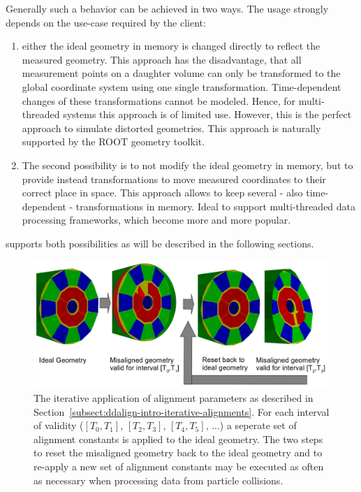 \documentclass[10pt,a4paper]{article}
\begin{document}
\noindent
Generally such a behavior can be achieved in two ways. The usage strongly depends
on the use-case required by the client:
\begin{enumerate}
\item either the ideal geometry in memory is changed directly to 
      reflect the  measured geometry. This approach has the 
      disadvantage, that all measurement points on a daughter 
      volume can only be transformed to the global coordinate
      system using one single transformation. Time-dependent changes of 
      these transformations cannot be modeled. Hence, for multi-threaded
      systems this approach is of limited use. However, this is the 
      perfect approach to simulate distorted geometries. This approach 
      is naturally supported by the ROOT geometry toolkit.
\item The second possibility is to not modify the ideal geometry in memory,
      but to provide instead transformations to move measured coordinates 
      to their correct place in space. This approach allows to keep 
      several - also time-dependent - transformations in memory. 
      Ideal to support multi-threaded data processing frameworks, 
      which become more and more popular.
\end{enumerate}

\noindent
\DDA supports both possibilities as will be described in the following sections.

\begin{figure}[t]
  \begin{center}
    \includegraphics[width=160mm] {DDAlign-iterative-misalignment}
    \caption{The iterative application of alignment parameters as described
    in Section~\ref{subsect:ddalign-intro-iterative-alignments}.
    For each interval of validity 
    ($[T_0,T_1]$, $[T_2,T_3]$, $[T_4,T_5]$, ...)
    a seperate set of alignment constants is applied to the ideal geometry.
    The two steps to reset the misaligned geometry back to the ideal
    geometry and
    to re-apply a new set of alignment constants may be executed as 
    often as necessary when processing data from particle collisions.}
    \label{fig:ddalign-aligned-iterative}
  \end{center}
\end{figure}
\end{document}
